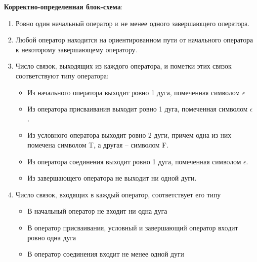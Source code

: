 \textbf{Корректно-определенная блок-схема}:
\begin{enumerate}
    \item Ровно один начальный оператор и не менее одного завершающего оператора.
    \item Любой оператор находится на ориентированном пути от начального оператора к некоторому завершающему оператору.
    \item Число связок, выходящих из каждого оператора, и пометки этих связок соответствуют типу оператора: 
    \begin{itemize}
        \item Из начального оператора выходит ровно 1 дуга, помеченная символом $\epsilon$
        \item Из оператора присваивания выходит ровно 1 дуга, помеченная символом $\epsilon$.
        \item Из условного оператора выходит ровно 2 дуги, причем одна из них помечена символом T, а другая – символом F.
        \item Из оператора соединения выходит ровно 1 дуга, помеченная символом $\epsilon$.
        \item Из завершающего оператора не выходит ни одной дуги.
    \end{itemize}
    \item Число связок, входящих в каждый оператор, соответствует его типу
    \begin{itemize}
        \item В начальный оператор не входит ни одна дуга
        \item В оператор присваивания, условный и завершающий оператор входит ровно одна дуга
        \item В оператор соединения входит не менее одной дуги
    \end{itemize}
\end{enumerate}





